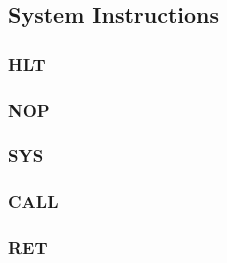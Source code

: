 \subsection{System Instructions}

\subsubsection{HLT }\label{sec:HLT}

\subsubsection{NOP }\label{sec:NOP}
 
\subsubsection{SYS }\label{sec:SYS}

\subsubsection{CALL }\label{sec:CALL}

\subsubsection{RET }\label{sec:RET}
